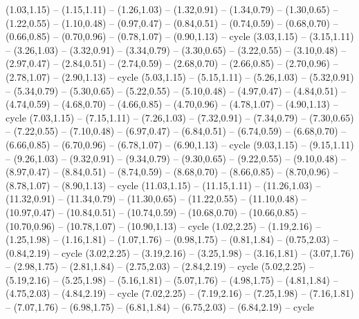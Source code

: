 \providecommand\Tissot[1]{\csname geo:Tissot:#1\endcsname}
\def\TissotListe{k1,k2,k3,k4,k5,k6,k7,k8,k9,k10,k11,k12,k13,k14,k15,k16,k17,k18,k19,k20,k21,k22,k23,k24,k25,k26,k27,k28,k29,k30}
\expandafter\def\csname geo:Tissot:k1\endcsname{
  (1.03,1.15) -- (1.15,1.11) -- (1.26,1.03) -- (1.32,0.91) -- (1.34,0.79) -- (1.30,0.65) -- (1.22,0.55) -- (1.10,0.48) -- (0.97,0.47) -- (0.84,0.51) -- (0.74,0.59) -- (0.68,0.70) -- (0.66,0.85) -- (0.70,0.96) -- (0.78,1.07) -- (0.90,1.13) -- cycle}
\expandafter\def\csname geo:Tissot:k2\endcsname{
  (3.03,1.15) -- (3.15,1.11) -- (3.26,1.03) -- (3.32,0.91) -- (3.34,0.79) -- (3.30,0.65) -- (3.22,0.55) -- (3.10,0.48) -- (2.97,0.47) -- (2.84,0.51) -- (2.74,0.59) -- (2.68,0.70) -- (2.66,0.85) -- (2.70,0.96) -- (2.78,1.07) -- (2.90,1.13) -- cycle}
\expandafter\def\csname geo:Tissot:k3\endcsname{
  (5.03,1.15) -- (5.15,1.11) -- (5.26,1.03) -- (5.32,0.91) -- (5.34,0.79) -- (5.30,0.65) -- (5.22,0.55) -- (5.10,0.48) -- (4.97,0.47) -- (4.84,0.51) -- (4.74,0.59) -- (4.68,0.70) -- (4.66,0.85) -- (4.70,0.96) -- (4.78,1.07) -- (4.90,1.13) -- cycle}
\expandafter\def\csname geo:Tissot:k4\endcsname{
  (7.03,1.15) -- (7.15,1.11) -- (7.26,1.03) -- (7.32,0.91) -- (7.34,0.79) -- (7.30,0.65) -- (7.22,0.55) -- (7.10,0.48) -- (6.97,0.47) -- (6.84,0.51) -- (6.74,0.59) -- (6.68,0.70) -- (6.66,0.85) -- (6.70,0.96) -- (6.78,1.07) -- (6.90,1.13) -- cycle}
\expandafter\def\csname geo:Tissot:k5\endcsname{
  (9.03,1.15) -- (9.15,1.11) -- (9.26,1.03) -- (9.32,0.91) -- (9.34,0.79) -- (9.30,0.65) -- (9.22,0.55) -- (9.10,0.48) -- (8.97,0.47) -- (8.84,0.51) -- (8.74,0.59) -- (8.68,0.70) -- (8.66,0.85) -- (8.70,0.96) -- (8.78,1.07) -- (8.90,1.13) -- cycle}
\expandafter\def\csname geo:Tissot:k6\endcsname{
  (11.03,1.15) -- (11.15,1.11) -- (11.26,1.03) -- (11.32,0.91) -- (11.34,0.79) -- (11.30,0.65) -- (11.22,0.55) -- (11.10,0.48) -- (10.97,0.47) -- (10.84,0.51) -- (10.74,0.59) -- (10.68,0.70) -- (10.66,0.85) -- (10.70,0.96) -- (10.78,1.07) -- (10.90,1.13) -- cycle}
\expandafter\def\csname geo:Tissot:k7\endcsname{
  (1.02,2.25) -- (1.19,2.16) -- (1.25,1.98) -- (1.16,1.81) -- (1.07,1.76) -- (0.98,1.75) -- (0.81,1.84) -- (0.75,2.03) -- (0.84,2.19) -- cycle}
\expandafter\def\csname geo:Tissot:k8\endcsname{
  (3.02,2.25) -- (3.19,2.16) -- (3.25,1.98) -- (3.16,1.81) -- (3.07,1.76) -- (2.98,1.75) -- (2.81,1.84) -- (2.75,2.03) -- (2.84,2.19) -- cycle}
\expandafter\def\csname geo:Tissot:k9\endcsname{
  (5.02,2.25) -- (5.19,2.16) -- (5.25,1.98) -- (5.16,1.81) -- (5.07,1.76) -- (4.98,1.75) -- (4.81,1.84) -- (4.75,2.03) -- (4.84,2.19) -- cycle}
\expandafter\def\csname geo:Tissot:k10\endcsname{
  (7.02,2.25) -- (7.19,2.16) -- (7.25,1.98) -- (7.16,1.81) -- (7.07,1.76) -- (6.98,1.75) -- (6.81,1.84) -- (6.75,2.03) -- (6.84,2.19) -- cycle}

